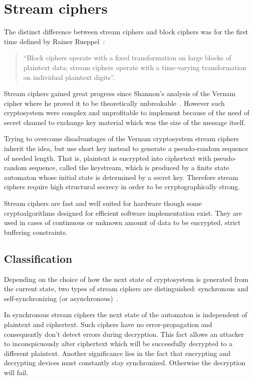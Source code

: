 \clearpage
\section{Stream ciphers}

The distinct difference between stream ciphers and block ciphers was for the
first time defined by Rainer Rueppel~\cite{robshaw:rsa:streamciphers}: 
\begin{quote}
    ``Block ciphers operate with a fixed transformation on large blocks of
    plaintext data; stream ciphers operate with a time-varying transformation on
    individual plaintext digits''.
\end{quote}
Stream ciphers gained great progress since Shannon's analysis of the 
Vernam cipher where he proved it to be theoretically
unbreakable~\cite{shannon:secrecy}. However such cryptosystem were
complex and unprofitable to implement because of the need of secret channel to exchange key
material which was the size of the message itself.

Trying to overcome disadvantages of the Vernam cryptosystem stream ciphers
inherit the idea, but use short key instead to generate a pseudo-random sequence
of needed length. That is, plaintext is encrypted into ciphertext with
pseudo-random sequence,  called the keystream, which is produced by a finite
state automaton whose initial state is determined by a secret key. Therefore
stream ciphers require high structural secrecy in order to be cryptographically
strong.

Stream ciphers are fast and well suited for hardware though some
cryptoalgorithms designed for efficient software implementation exist. They are
used in cases of continuous or unknown amount of data to be encrypted, strict
buffering constraints.

\subsection{Classification}
\label{sec:stream_ciphers_classification}

Depending on the choice of how the next state of cryptosystem is generated from
the current state, two types of stream ciphers are distinguished: synchronous
and self-synchronizing (or asynchronous)~\cite{menezes:applied_cryptography}.

In synchronous stream ciphers the next state of the automaton is independent of
plaintext and ciphertext. Such ciphers have no error-propagation and
consequently don't detect errors during decryption. This fact allows an attacker
to inconspicuously alter ciphertext which will be successfully decrypted to a
different plaintext. Another significance lies in the fact that encrypting and
decrypting devices must constantly stay synchronized. Otherwise the decryption
will fail. 

